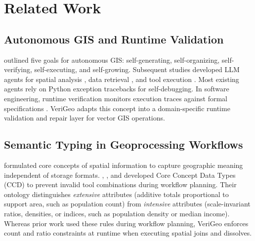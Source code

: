 \documentclass[10pt,twocolumn]{article}
\begin{document}
\section{Related Work}

\subsection{Autonomous GIS and Runtime Validation}
\citet{li2023autonomous} outlined five goals for autonomous GIS: self-generating, self-organizing, self-verifying, self-executing, and self-growing. Subsequent studies developed LLM agents for spatial analysis \cite{akinboyewa2025giscopilot}, data retrieval \cite{ning2025autonomous}, and tool execution \cite{zhang2024geogpt}. Most existing agents rely on Python exception tracebacks for self-debugging. In software engineering, runtime verification monitors execution traces against formal specifications \cite{leucker2009brief}. VeriGeo adapts this concept into a domain-specific runtime validation and repair layer for vector GIS operations.

\subsection{Semantic Typing in Geoprocessing Workflows}
\citet{kuhn2012core} formulated core concepts of spatial information to capture geographic meaning independent of storage formats. \citet{scheider2017semantic}, \citet{scheider2020ontology}, and \citet{meerlo2021loose} developed Core Concept Data Types (CCD) to prevent invalid tool combinations during workflow planning. Their ontology distinguishes \emph{extensive} attributes (additive totals proportional to support area, such as population count) from \emph{intensive} attributes (scale-invariant ratios, densities, or indices, such as population density or median income). Whereas prior work used these rules during workflow planning, VeriGeo enforces count and ratio constraints at runtime when executing spatial joins and dissolves.
\end{document}
